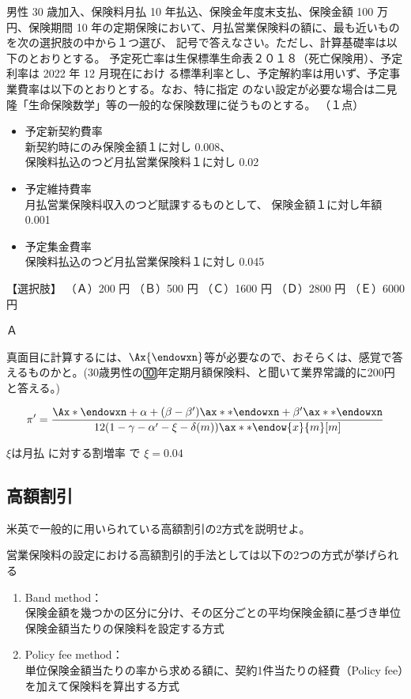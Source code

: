 \documentclass[report,gutter=10mm,fore-edge=10mm,uplatex,dvipdfmx]{jlreq}
\begin{document}
男性 30 歳加入、保険料月払 10 年払込、保険金年度末支払、保険金額 100 万円、保険期間 10
年の定期保険において、月払営業保険料の額に、最も近いものを次の選択肢の中から１つ選び、
記号で答えなさい。ただし、計算基礎率は以下のとおりとする。
予定死亡率は生保標準生命表２０１８（死亡保険用）、予定利率は 2022 年 12 月現在におけ
る標準利率とし、予定解約率は用いず、予定事業費率は以下のとおりとする。なお、特に指定
のない設定が必要な場合は二見隆「生命保険数学」等の一般的な保険数理に従うものとする。
（１点）

\begin{itemize}
 \item 予定新契約費率\\
新契約時にのみ保険金額１に対し 0.008、\\
保険料払込のつど月払営業保険料１に対し 0.02
 \item 予定維持費率\\
月払営業保険料収入のつど賦課するものとして、
保険金額１に対し年額 0.001
 \item 予定集金費率\\
保険料払込のつど月払営業保険料１に対し 0.045
\end{itemize}
【選択肢】
（Ａ）200 円
（Ｂ）500 円
（Ｃ）1600 円
（Ｄ）2800 円
（Ｅ）6000 円

Ａ

真面目に計算するには、$\Ax{\endowxn}$等が必要なので、おそらくは、感覚で答えるものかと。(30歳男性の🔟年定期月額保険料、と聞いて業界常識的に200円と答える。)

$$
\pi'=\frac{\Ax*{\endowxn}+\alpha+(\beta-\beta')\ax**{\endowxn}+\beta'\ax**{\endowxn} }
{12(1-\gamma-\alpha'-\xi-\delta(m))\ax**{\endow{x}{m}}[m]}
$$

$\xi$は月払 に対する割増率 で $\xi=0.04$



\subsection{高額割引}


米英で一般的に用いられている高額割引の2方式を説明せよ。

営業保険料の設定における高額割引的手法としては以下の2つの方式が挙げられる
\begin{enumerate}
\tightlist
\item
  Band method：\\
  保険金額を幾つかの区分に分け、その区分ごとの平均保険金額に基づき単位保険金額当たりの保険料を設定する方式
\item
  Policy fee method：\\
  単位保険金額当たりの率から求める額に、契約1件当たりの経費（Policy
  fee）を加えて保険料を算出する方式
\end{enumerate}
\end{document}
